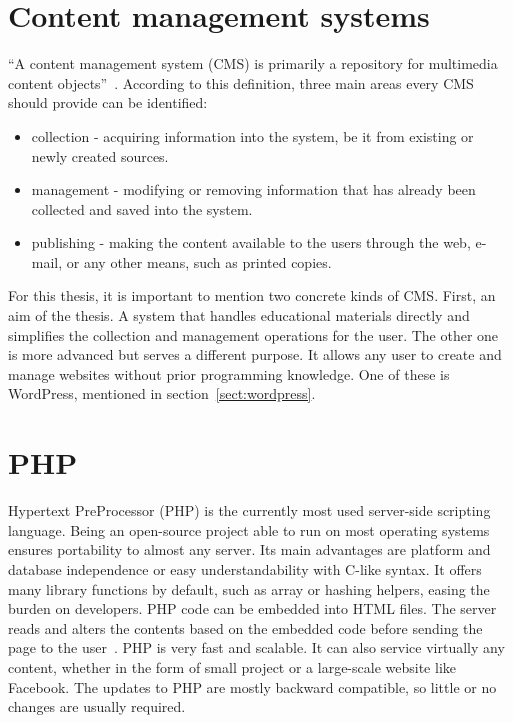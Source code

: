 \documentclass[
  digital,     %
  oneside,     %
  nosansbold,  %
  colorbold, %
  lof,         %
  lot,         %
]{fithesis4}
\begin{document}
\section{Content management systems}

“A content management system (CMS) is primarily a repository for multimedia content
objects”~\parencite[page.~17]{mauthe04}. According to this definition, three main
areas every CMS should provide can be identified:

\begin{itemize}
    \item collection - acquiring information into the system, be it from existing
    or newly created sources.
    \item management - modifying or removing information that has already been
    collected and saved into the system.
    \item publishing - making the content available to the users through the web,
    e-mail, or any other means, such as printed copies.
\end{itemize}

For this thesis, it is important to mention two concrete kinds of CMS. First, an aim
of the thesis. A system that handles educational materials directly and simplifies
the collection and management operations for the user. The other one is more advanced
but serves a different purpose. It allows any user to create and manage websites
without prior programming knowledge. One of these is WordPress, mentioned in
section~\ref{sect:wordpress}.

\section{PHP}

Hypertext PreProcessor (PHP) is the currently most used \mbox{server-side} scripting
language. Being an \mbox{open-source} project able to run on most operating systems
ensures portability to almost any server. Its main advantages are platform and database
independence or easy understandability with \mbox{C-like} syntax. It offers many
library functions by default, such as array or hashing helpers, easing the burden
on developers. PHP code can be embedded into HTML files. The server reads and
alters the contents based on the embedded code before sending the page to the
user~\parencite[page.~30]{welling17}. PHP is very fast and scalable. It can also
service virtually any content, whether in the form of small project or
a \mbox{large-scale} website like Facebook. The updates to PHP are mostly backward
compatible, so little or no changes are usually required.
\end{document}
